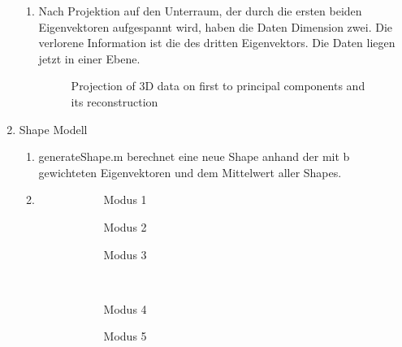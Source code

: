 \documentclass[]{report}
\newlength\figureheight
\newlength\figurewidth
\begin{document}
\begin{enumerate}
\begin{enumerate}
			\item
			Nach Projektion auf den Unterraum, der durch die ersten beiden Eigenvektoren aufgespannt wird, haben die Daten Dimension zwei. Die verlorene Information ist die des dritten Eigenvektors. Die Daten liegen jetzt in einer Ebene.
			\setlength\figureheight{7cm}
			\setlength\figurewidth{\textwidth}
			\begin{figure}[tbp!]
				\centering
				
				\caption{Projection of 3D data on first to principal components and its reconstruction} 
				\label{fig:3D projection and reconstruction}
			\end{figure}
		\end{enumerate}
		
		\item Shape Modell
		\begin{enumerate}
			\item
			generateShape.m berechnet eine neue Shape anhand der mit b gewichteten Eigenvektoren und dem Mittelwert aller Shapes.
			\item 
			\setlength\figureheight{4cm}
			\setlength{}
			\begin{figure}[tbp!]
				\begin{subfigure}{0.3\textwidth}
					\centering
					
					\caption{Modus 1}
					\label{fig:mode1}
				\end{subfigure}
				\quad
				\begin{subfigure}{0.3\textwidth}
					\centering
					
					\caption{Modus 2}
					\label{fig:mode2}
				\end{subfigure}	
				\quad
				\begin{subfigure}{0.3\textwidth}
					\centering
					
					\caption{Modus 3}
					\label{fig:mode3}
				\end{subfigure}	
				\\
				\begin{subfigure}{0.3\textwidth}
					\centering
					
					\caption{Modus 4}
					\label{fig:mode4}
				\end{subfigure}
				\quad
				\begin{subfigure}{0.3\textwidth}
					\centering
					
					\caption{Modus 5}
					\label{fig:mode5}
				\end{subfigure}	
				\quad
				\begin{subfigure}{0.3\textwidth}
					\centering
					

\end{subfigure}
\end{figure}
\end{enumerate}
\end{enumerate}
\end{document}
